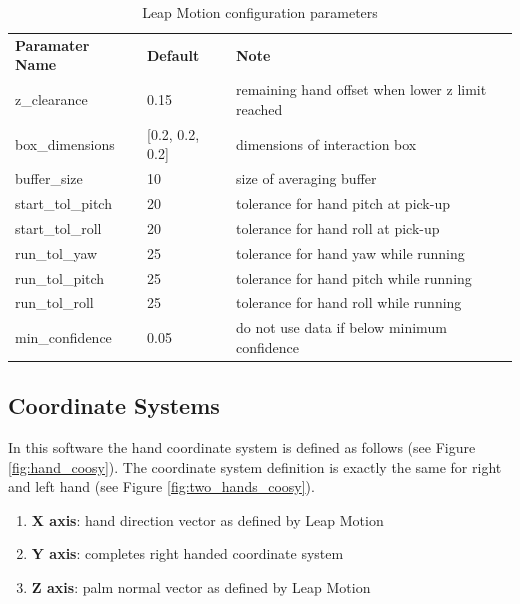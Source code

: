 \documentclass[headsepline,footinclude=false,fontsize=11pt,paper=a4,listof=totoc,bibliography=totoc,BCOR=12mm,DIV=14]{scrbook}
\begin{document}
\begin{table}[h]
\centering
\begin{tabular}{lll}
\textbf{Paramater Name} & \textbf{Default}    & \textbf{Note}                                   \\
z\_clearance            & 0.15                & remaining hand offset when lower z limit reached \\
box\_dimensions         & {[}0.2, 0.2, 0.2{]} & dimensions of interaction box                   \\
buffer\_size            & 10                  & size of averaging buffer                        \\
start\_tol\_pitch       & 20                  & tolerance for hand pitch at pick-up             \\
start\_tol\_roll        & 20                  & tolerance for hand roll at pick-up              \\
run\_tol\_yaw           & 25                  & tolerance for hand yaw while running            \\
run\_tol\_pitch         & 25                  & tolerance for hand pitch while running          \\
run\_tol\_roll          & 25                  & tolerance for hand roll while running           \\
min\_confidence         & 0.05                & do not use data if below minimum confidence    
\end{tabular}
\caption{Leap Motion configuration parameters}
\label{tab:leap_params}
\end{table}

\newpage
\subsection{Coordinate Systems}

In this software the hand coordinate system is defined as follows (see Figure \ref{fig:hand_coosy}). The coordinate system definition is exactly the same for right and left hand (see Figure \ref{fig:two_hands_coosy}).

\begin{enumerate}
	\item \textbf{X axis}: hand direction vector as defined by Leap Motion 
	\item \textbf{Y axis}: completes right handed coordinate system
	\item \textbf{Z axis}: palm normal vector as defined by Leap Motion 
\end{enumerate}
\end{document}
